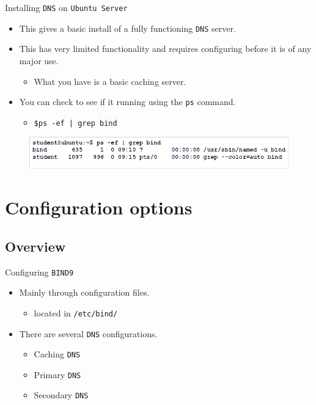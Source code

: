 \documentclass{beamer}
\begin{document}
\begin{frame}{Installing \texttt{DNS} on \texttt{Ubuntu Server}}
  \begin{itemize}
    \item This gives a basic install of a fully functioning \texttt{DNS} server.
    \item This has very limited functionality and requires configuring before it is of any major use.
      \begin{itemize}
        \item What you have is a basic caching server.
      \end{itemize}
  \item You can check to see if it running using the \texttt{ps} command.
      \begin{itemize}
        \item \texttt{\$ps -ef | grep bind}
      \end{itemize}
    \end{itemize}
  \begin{figure}
    \begin{center}
      \includegraphics[width=0.9\linewidth]{ps-bind.png}
    \end{center}
  \end{figure}
\end{frame}

\section{Configuration options}
\subsection{Overview}
\begin{frame}{Configuring \texttt{BIND9}}
  \begin{itemize}
    \item Mainly through configuration files.
      \begin{itemize}
        \item located in \texttt{/etc/bind/}
      \end{itemize}
    \item There are several \texttt{DNS} configurations.
      \begin{itemize}
        \item Caching \texttt{DNS}
        \item Primary \texttt{DNS}
        \item Secondary \texttt{DNS}
      \end{itemize}
  \end{itemize}
\end{frame}
\end{document}
